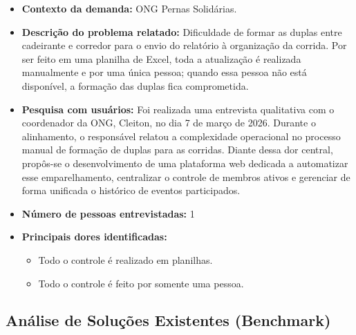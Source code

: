 \documentclass[12pt,a4paper]{article}
\begin{document}
\begin{itemize}

    \item \textbf{Contexto da demanda:} ONG Pernas Solidárias.

    \item \textbf{Descrição do problema relatado:}
    Dificuldade de formar as duplas entre cadeirante e corredor para o envio do
    relatório à organização da corrida. Por ser feito em uma planilha de Excel,
    toda a atualização é realizada manualmente e por uma única pessoa; quando essa
    pessoa não está disponível, a formação das duplas fica comprometida.

    \item \textbf{Pesquisa com usuários:} Foi realizada uma entrevista qualitativa com o coordenador da ONG, Cleiton, no dia 7 de março de 2026. Durante o alinhamento, o responsável relatou a complexidade operacional no processo manual de formação de duplas para as corridas. Diante dessa dor central, propôs-se o desenvolvimento de uma plataforma web dedicada a automatizar esse emparelhamento, centralizar o controle de membros ativos e gerenciar de forma unificada o histórico de eventos participados.

    \item \textbf{Número de pessoas entrevistadas:} 1

    \item \textbf{Principais dores identificadas:}
    \begin{itemize}
        \item Todo o controle é realizado em planilhas.
        \item Todo o controle é feito por somente uma pessoa.
    \end{itemize}

\end{itemize}

\subsection{Análise de Soluções Existentes (Benchmark)}
\end{document}
